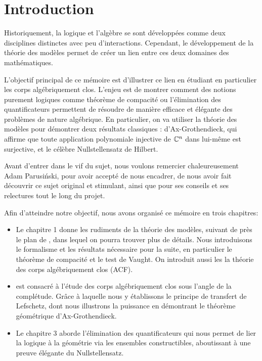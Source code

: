 \chapter*{Introduction}

Historiquement, la logique et l'algèbre se sont développées comme deux
disciplines distinctes avec peu d'interactions. Cependant, le développement de
la théorie des modèles permet de créer un lien entre ces deux domaines des mathématiques.

L'objectif principal de ce mémoire est d'illustrer ce lien en étudiant en
particulier les corps algébriquement clos. L'enjeu est de montrer comment des
notions purement logiques comme théorème de compacité ou l'élimination des
quantificateurs permettent de résoudre de manière efficace et élégante des problèmes de
nature algébrique. En particulier, on va utiliser la théorie des modèles pour démontrer deux résultats
classiques : d'Ax-Grothendieck, qui affirme que toute application polynomiale
injective de $\mathbb{C}^n$ dans lui-même est surjective, et le célèbre Nullstellensatz
de Hilbert.

Avant d'entrer dans le vif du sujet, nous voulons remercier chaleureusement Adam
Parusiński, pour avoir accepté de nous encadrer, de nous avoir fait découvrir ce
sujet original et stimulant, ainsi que pour ses conseils et ses relectures tout
le long du projet.

Afin d'atteindre notre objectif, nous avons organisé ce mémoire en trois
chapitres:

\begin{itemize}
    \item Le chapitre 1 donne les rudiments de la théorie des modèles, suivant de près
    le plan de \cite{Marker_2002}, dans lequel on pourra trouver plus de détails. Nous
    introduisons le formalisme et les résultats nécessaire pour la suite, en particulier 
    le théorème de compacité et le test de Vaught. On introduit aussi les la
    théorie des corps algébriquement clos (ACF).
    \item est consacré à l'étude des corps algébriquement clos sous l'angle de
    la complétude. 
    Grâce à laquelle nous y établissons le principe de transfert de Lefschetz, dont nous illustrons la puissance en démontrant le théorème géométrique d'Ax-Grothendieck.
    \item Le chapitre 3 aborde l'élimination des quantificateurs qui nous permet de lier la logique à la géométrie via les ensembles constructibles, aboutissant à une preuve élégante du Nullstellensatz.
\end{itemize}

